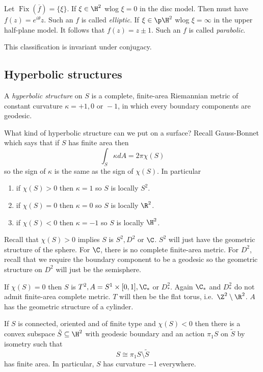 \documentclass[a4paper]{article}
\renewcommand{\b}{\p}
\DeclareMathOperator{\Fix}{Fix}
\begin{document}
Let \(\Fix(\overline f) = \{\xi\}\). If \(\xi \in \H^2\) wlog \(\xi = 0\) in the disc model. Then must have \(f(z) = e^{i\theta} z\). Such an \(f\) is called \emph{elliptic}. If \(\xi \in \b \H^2\) wlog \(\xi = \infty\) in the upper half-plane model. It follows that \(f(z) = z \pm 1\). Such an \(f\) is called \emph{parabolic}.

\begin{remark}
  This classification is invariant under conjugacy.
\end{remark}

\subsection{Hyperbolic structures}

A \emph{hyperbolic structure} on \(S\) is a complete, finite-area Riemannian metric of constant curvature \(\kappa = +1, 0 \text{ or } -1\), in which every boundary components are geodesic.

What kind of hyperbolic structure can we put on a surface? Recall Gauss-Bonnet which says that if \(S\) has finite area then
\[
  \int_S \kappa dA = 2\pi \chi(S)
\]
so the sign of \(\kappa\) is the same as the sign of \(\chi(S)\). In particular
\begin{enumerate}
\item if \(\chi(S) > 0\) then \(\kappa = 1\) so \(S\) is locally \(S^2\).
\item if \(\chi(S) = 0\) then \(\kappa = 0\) so \(S\) is locally \(\R^2\).
\item if \(\chi(S) < 0\) then \(\kappa = -1\) so \(S\) is locally \(\H^2\).
\end{enumerate}

\begin{eg}
  Recall that \(\chi(S) > 0\) implies \(S\) is \(S^2, D^2\) or \(\C\). \(S^2\) will just have the geometric structure of the sphere. For \(\C\), there is no complete finite-area metric. For \(D^2\), recall that we require the boundary component to be a geodesic so the geometric structure on \(D^2\) will just be the semisphere.

  If \(\chi(S) = 0\) then \(S\) is \(T^2, A = S^1 \times [0, 1], \C_*\) or \(D_*^2\). Again \(\C_*\) and \(D_*^2\) do not admit finite-area complete metric. \(T\) will then be the flat torus, i.e.\ \(\Z^2 \setminus \R^2\). \(A\) has the geometric structure of a cylinder.
\end{eg}

\begin{theorem}
  If \(S\) is connected, oriented and of finite type and \(\chi(S) < 0\) then there is a convex subspace \(\tilde S \subseteq \H^2\) with geodesic boundary and an action \(\pi_1S\) on \(\tilde S\) by isometry such that
  \[
    S \cong \pi_1 S \setminus \tilde S
  \]
  has finite area. In particular, \(S\) has curvature \(-1\) everywhere.
\end{theorem}
\end{document}
